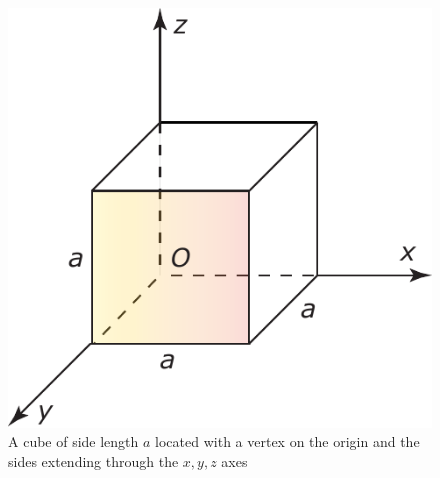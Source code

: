 \begin{figure}[H]
  \centering
  \includegraphics[width=0.25\linewidth]{fig/images/extension_cube.pdf}
  \caption{A cube of side length $a$ located with a vertex on the origin and the sides extending through the $x,y,z$ axes}
  \label{fig:extension_cube}
\end{figure}